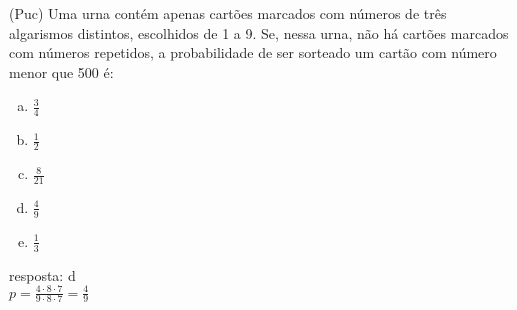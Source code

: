 \begin{ex}
 (Puc) Uma urna contém apenas cartões marcados com números de três algarismos distintos, escolhidos de 1 a 9. Se, nessa urna, não há cartões marcados com números repetidos, a probabilidade de ser sorteado um cartão com número menor que 500 é:
    \begin{enumerate}[(a)]
    \item $\frac{3}{4}$
    \item $\frac{1}{2}$
    \item $\frac{8}{21}$
    \item $\frac{4}{9}$
    \item $\frac{1}{3}$
    \end{enumerate}
      \begin{sol}
        resposta: d \\
        $p=\frac{4\cdot8\cdot7}{9\cdot8\cdot7}=\frac{4}{9}$
      \end{sol}
\end{ex}